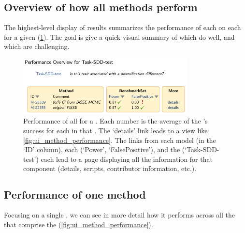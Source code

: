 \subsection{Overview of how all methods perform}

The highest-level display of results summarizes the performance of each \Method on each \Benchmark for a given \Task (\cref{fig:ui_methods_benchmarks}).
The goal is give a quick visual summary of which \Methods do well, and which \Benchmarks are challenging.

\begin{figure}[h]
    \centering \includegraphics[width=0.8\textwidth]{images/methods_benchmarks}
    \caption{Performance of all \Methods for a \Task.
        Each number is the average of the \Method's success for each \Element in that \Benchmark.
        The `details' link leads to a view like \cref{fig:ui_method_performance}.
        The links from each model (in the `ID' column), each \Benchmark (`Power', `FalsePositive'), and the \Task (`Task-SDD-test') each lead to a page displaying all the information for that component (details, scripts, contributor information, etc.).
    }
    \label{fig:ui_methods_benchmarks}
\end{figure}

\subsection{Performance of one method}

Focusing on a single \Method, we can see in more detail how it performs across all the \Elements that comprise the \Benchmarks (\cref{fig:ui_method_performance}).

